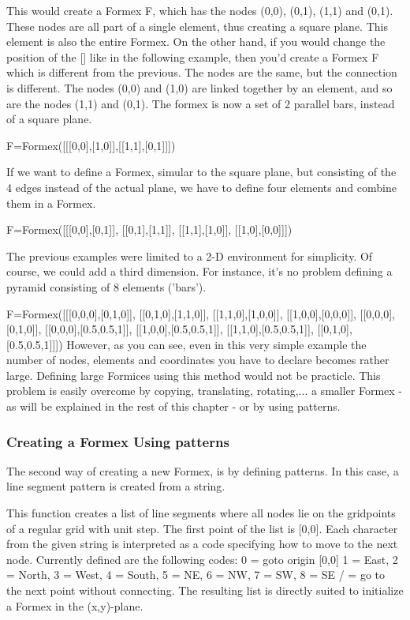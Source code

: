 \documentclass[a4paper]{manual}
\newenvironment{mycode}{\par\small\sffamily}{} %
\begin{document}
{This would create a Formex F, which has the nodes (0,0), (0,1), (1,1) and (0,1). These nodes are all part of a single element, thus creating a square plane. This element is also the entire Formex.
On the other hand, if you would change the position of the [] %
like in the following example, then you'd create a Formex F which is different from the previous. The nodes are the same, but the connection is different. The nodes (0,0) and (1,0) are linked together by an element, and so are the nodes (1,1) and (0,1). The formex is now a set of 2 parallel bars, instead of a square plane. 
\begin{mycode}
	F=Formex([[[0,0],[1,0]],[[1,1],[0,1]]])
\end{mycode}

If we want to define a Formex, simular to the square plane, but consisting of the 4 edges instead of the actual plane, we have to define four elements and combine them in a Formex.
\begin{mycode}
F=Formex([[[0,0],[0,1]], [[0,1],[1,1]], [[1,1],[1,0]], [[1,0],[0,0]]])
\end{mycode}

The previous examples were limited to a 2-D environment for simplicity. Of course, we could add a third dimension. For instance, it's no problem defining a pyramid consisting of 8 elements ('bars').
\begin{mycode}
	F=Formex([[[0,0,0],[0,1,0]], [[0,1,0],[1,1,0]], [[1,1,0],[1,0,0]], [[1,0,0],[0,0,0]], [[0,0,0],[0,1,0]], [[0,0,0],[0.5,0.5,1]], [[1,0,0],[0.5,0.5,1]], [[1,1,0],[0.5,0.5,1]], [[0,1,0],[0.5,0.5,1]]])
\end{mycode}
However, as you can see, even in this very simple example the number of nodes, elements and coordinates you have to declare becomes rather large. Defining large Formices using this method would not be practicle. This problem is easily overcome by copying, translating, rotating,... a smaller Formex - as will be explained in the rest of this chapter - or by using patterns.
 
\subsubsection{Creating a Formex Using patterns}

The second way of creating a new Formex, is by defining patterns. In this case, a line segment pattern is created from a string.

    This function creates a list of line segments where all nodes lie on the
    gridpoints of a regular grid with unit step.
    The first point of the list is [0,0]. Each character from the given
    string is interpreted as a code specifying how to move to the next node.
    Currently defined are the following codes:
    0 = goto origin [0,0]
    1 = East, 2 = North, 3 = West, 4 = South, 5 = NE, 6 = NW, 7 = SW, 8 = SE
    / = go to the next point without connecting.
    The resulting list is directly suited to initialize a Formex in the
    (x,y)-plane.

}
\end{document}
